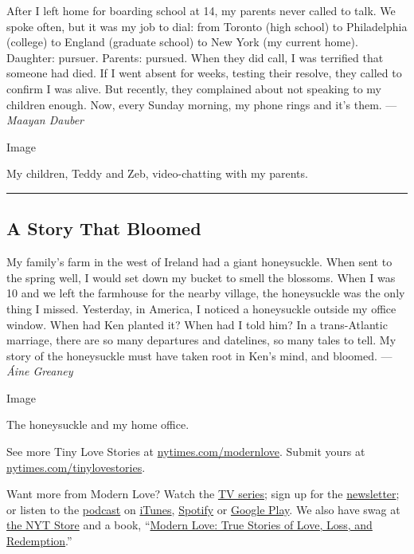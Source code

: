 After I left home for boarding school at 14, my parents never called to
talk. We spoke often, but it was my job to dial: from Toronto (high
school) to Philadelphia (college) to England (graduate school) to New
York (my current home). Daughter: pursuer. Parents: pursued. When they
did call, I was terrified that someone had died. If I went absent for
weeks, testing their resolve, they called to confirm I was alive. But
recently, they complained about not speaking to my children enough. Now,
every Sunday morning, my phone rings and it's them. --- \emph{Maayan
Dauber}

Image

My children, Teddy and Zeb, video-chatting with my parents.

\begin{center}\rule{0.5\linewidth}{\linethickness}\end{center}

\hypertarget{a-story-that-bloomed}{%
\subsection{A Story That Bloomed}\label{a-story-that-bloomed}}

My family's farm in the west of Ireland had a giant honeysuckle. When
sent to the spring well, I would set down my bucket to smell the
blossoms. When I was 10 and we left the farmhouse for the nearby
village, the honeysuckle was the only thing I missed. Yesterday, in
America, I noticed a honeysuckle outside my office window. When had Ken
planted it? When had I told him? In a trans-Atlantic marriage, there are
so many departures and datelines, so many tales to tell. My story of the
honeysuckle must have taken root in Ken's mind, and bloomed. ---
\emph{Áine Greaney}

Image

The honeysuckle and my home office.

See more Tiny Love Stories at
\href{https://www.nytimes.com/column/modern-love}{nytimes.com/modernlove}.
Submit yours at
\href{http://nytimes.com/tinylovestories}{nytimes.com/tinylovestories}.

Want more from Modern Love? Watch the
\href{https://www.nytimes.com/2019/09/12/style/modern-love-tv-show-trailer.html}{TV
series}; sign up for the
\href{https://www.nytimes.com/newsletters/love-letter}{newsletter}; or
listen to the
\href{https://www.nytimes.com/column/modern-love-podcast}{podcast} on
\href{https://itunes.apple.com/us/podcast/modern-love/id1065559535?mt=2\&version=meter+at+0\&module=meter-Links\&pgtype=article\&contentId=\&mediaId=\&referrer=\&priority=true\&action=click\&contentCollection=meter-links-click}{iTunes},
\href{https://open.spotify.com/show/03Er7mSPq9IEewOgbPD3vO}{Spotify} or
\href{https://play.google.com/music/listen?u=0\#/ps/Iktqjbkz7bychbnofblw32dik64}{Google
Play}. We also have swag at
\href{https://store.nytimes.com/collections/modern-love}{the NYT Store}
and a book,
``\href{https://www.penguinrandomhouse.com/books/623036/modern-love-revised-and-updated-by-edited-by-daniel-jones-with-contributions-by-andrew-rannells-ayelet-waldman-amy-krouse-rosenthal-veronica-chambers-and-more/}{Modern
Love: True Stories of Love, Loss, and Redemption}.''

